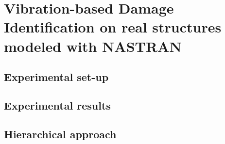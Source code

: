 \chapter{Vibration-based Damage Identification on real structures modeled with NASTRAN}
\label{chp:9}

\section{Experimental set-up}

\section{Experimental results}

\section{Hierarchical approach}